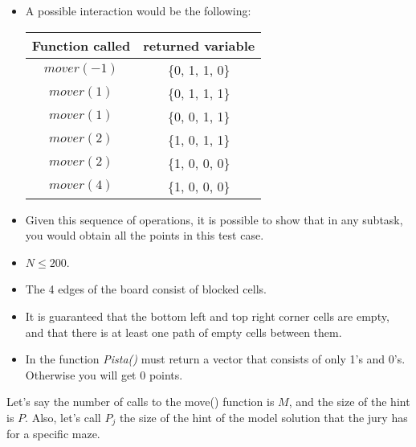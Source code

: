 \documentclass[12pt]{scrartcl}
\begin{document}
\begin{itemize}
        \item A possible interaction would be the following:
        \begin{center}
            \begin{tabular}{|c|c|}
                \hline
                 Function called & returned variable \\
                 \hline
                 $mover(-1)$ & \{0, 1, 1, 0\} \\
                 \hline
                 $mover(1)$ & \{0, 1, 1, 1\} \\
                 \hline
                 $mover(1)$ & \{0, 0, 1, 1\} \\
                 \hline
                 $mover(2)$ & \{1, 0, 1, 1\} \\
                 \hline
                 $mover(2)$ & \{1, 0, 0, 0\} \\
                 \hline
                 $mover(4)$ & \{1, 0, 0, 0\} \\
                 \hline
            \end{tabular}
        \end{center}
        \item Given this sequence of operations, it is possible to show that in any subtask, you would obtain all the points in this test case.
        \end{itemize}

        \begin{itemize}
            \item $N \le 200$.
            \item The 4 edges of the board consist of blocked cells.
            \item It is guaranteed that the bottom left and top right corner cells are empty, and that there is at least one path of empty cells between them.
            \item In the function \textit{Pista()} must return a vector that consists of only 1's and 0's. Otherwise you will get 0 points.
        \end{itemize}
        

    Let's say the number of calls to the move() function is $M$, and the size of the hint is $P$.
    Also, let's call $P_j$ the size of the hint of the model solution that the jury has for a specific maze.
\end{document}
